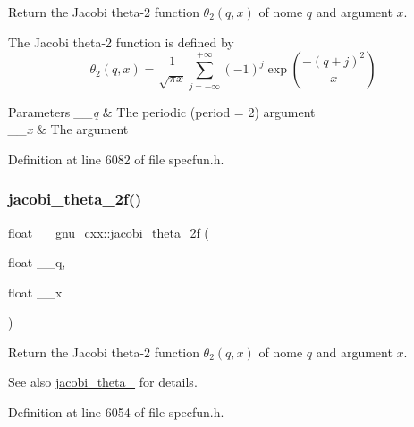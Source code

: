 Return the Jacobi theta-\/2 function $ \theta_2(q,x) $ of nome $ q $ and argument $ x $.

The Jacobi theta-\/2 function is defined by \[ \theta_2(q,x) = \frac{1}{\sqrt{\pi x}} \sum_{j=-\infty}^{+\infty} (-1)^j \exp\left( \frac{-(q + j)^2}{x} \right) \]


\begin{DoxyParams}{Parameters}
{\em \+\_\+\+\_\+q} & The periodic (period = 2) argument \\
\hline
{\em \+\_\+\+\_\+x} & The argument \\
\hline
\end{DoxyParams}


Definition at line 6082 of file specfun.\+h.

\mbox{\label{group__gnu__math__spec__func_gaa99e91c0753410a42b57cbf417cf7ea0}} 
\subsubsection{\texorpdfstring{jacobi\+\_\+theta\+\_\+2f()}{jacobi\_theta\_2f()}}
{\footnotesize\ttfamily float \+\_\+\+\_\+gnu\+\_\+cxx\+::jacobi\+\_\+theta\+\_\+2f (\begin{DoxyParamCaption}\item[{float}]{\+\_\+\+\_\+q,  }\item[{float}]{\+\_\+\+\_\+x }\end{DoxyParamCaption})\hspace{0.3cm}{\ttfamily [inline]}}

Return the Jacobi theta-\/2 function $ \theta_2(q,x) $ of nome $ q $ and argument $ x $.

\begin{DoxySeeAlso}{See also}
\hyperlink{group__gnu__math__spec__func_gaf6b13dac1f112a870299d75cb4cf42cc}{jacobi\+\_\+theta\+\_} for details. 
\end{DoxySeeAlso}


Definition at line 6054 of file specfun.\+h.

\mbox{\label{group__gnu__math__spec__func_ga2db5cb3025b9068e79dc7aa21bc9af5b}} 
